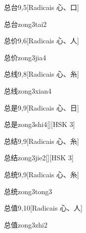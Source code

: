 \begin{entry}{总台}{9,5}[Radicais ⼼、⼝]
  \begin{phonetics}{总台}{zong3tai2}
  \end{phonetics}
\end{entry}

\begin{entry}{总价}{9,6}[Radicais ⼼、⼈]
  \begin{phonetics}{总价}{zong3jia4}
  \end{phonetics}
\end{entry}

\begin{entry}{总线}{9,8}[Radicais ⼼、⽷]
  \begin{phonetics}{总线}{zong3xian4}
  \end{phonetics}
\end{entry}

\begin{entry}{总是}{9,9}[Radicais ⼼、⽇]
  \begin{phonetics}{总是}{zong3shi4}[][HSK 3]
  \end{phonetics}
\end{entry}

\begin{entry}{总结}{9,9}[Radicais ⼼、⽷]
  \begin{phonetics}{总结}{zong3jie2}[][HSK 3]
  \end{phonetics}
\end{entry}

\begin{entry}{总统}{9,9}[Radicais ⼼、⽷]
  \begin{phonetics}{总统}{zong3tong3}
  \end{phonetics}
\end{entry}

\begin{entry}{总值}{9,10}[Radicais ⼼、⼈]
  \begin{phonetics}{总值}{zong3zhi2}
  \end{phonetics}
\end{entry}

